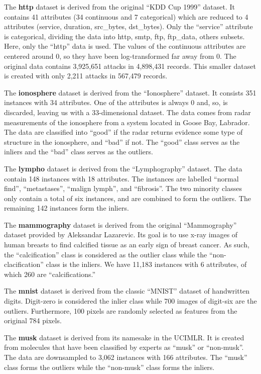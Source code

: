 The \textbf{http} dataset is derived from the original ``KDD Cup 1999'' dataset.
It contains 41 attributes (34 continuous and 7 categorical) which are reduced to 4 attributes (service, duration, src\_bytes, dst\_bytes).
Only the ``service'' attribute is categorical, dividing the data into {http, smtp, ftp, ftp\_data, others} subsets.
Here, only the ``http'' data is used.
The values of the continuous attributes are centered around 0, so they have been log-transformed far away from 0.
The original data contains 3,925,651 attacks in 4,898,431 records.
This smaller dataset is created with only 2,211 attacks in 567,479 records.

The \textbf{ionosphere} dataset is derived from the ``Ionosphere'' dataset.
It consists 351 instances with 34 attributes.
One of the attributes is always 0 and, so, is discarded, leaving us with a 33-dimensional dataset.
The data comes from radar measurements of the ionosphere from a system located in Goose Bay, Labrador.
The data are classified into ``good'' if the radar returns evidence some type of structure in the ionosphere, and ``bad'' if not.
The ``good'' class serves as the inliers and the ``bad'' class serves as the outliers.

The \textbf{lympho} dataset is derived from the ``Lymphography'' dataset.
The data contain 148 instances with 18 attributes.
The instances are labelled ``normal find'', ``metastases'', ``malign lymph'', and ``fibrosis''.
The two minority classes only contain a total of six instances, and are combined to form the outliers.
The remaining 142 instances form the inliers.

The \textbf{mammography} dataset is derived from the original ``Mammography'' dataset provided by Aleksandar Lazarevic.
Its goal is to use x-ray images of human breasts to find calcified tissue as an early sign of breast cancer.
As such, the ``calcification'' class is considered as the outlier class while the ``non-clacification'' class is the inliers.
We have 11,183 instances with 6 attributes, of which 260 are ``calcifications.''

The \textbf{mnist} dataset is derived from the classic ``MNIST'' dataset of handwritten digits.
Digit-zero is considered the inlier class while 700 images of digit-six are the outliers.
Furthermore, 100 pixels are randomly selected as features from the original 784 pixels.

The \textbf{musk} dataset is derived from its namesake in the UCIMLR\@.
It is created from molecules that have been classified by experts as ``musk'' or ``non-musk''.
The data are downsampled to 3,062 instances with 166 attributes.
The ``musk'' class forms the outliers while the ``non-musk'' class forms the inliers.

